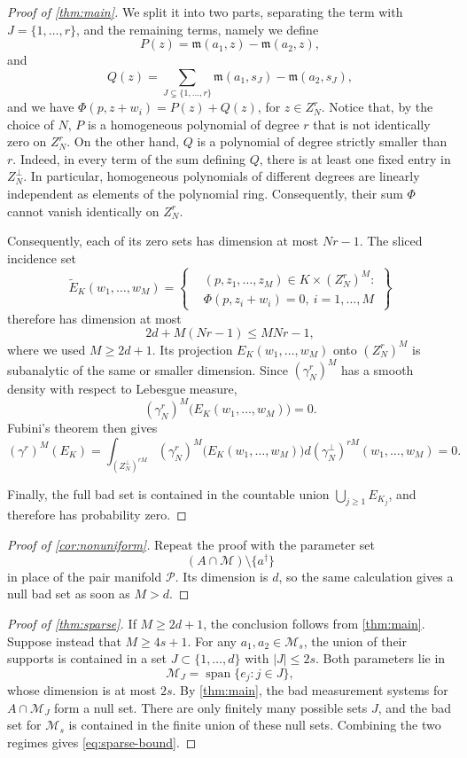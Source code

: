\documentclass[11pt,oneside]{amsart}
\theoremstyle{plain}
\theoremstyle{definition}
\theoremstyle{remark}
\newcommand{\calM}{\mathcal{M}}
\begin{document}
\begin{proof}[Proof of \cref{thm:main}]
We split it into two parts, separating the term with $J=\{1,\dots,r\}$, and the remaining terms, namely we define
\[
    P(z)=\mathfrak{m}(a_1,z)-\mathfrak{m}(a_2,z),
\]
and
\[
    Q(z)= \sum_{J\subsetneq\{1,\dots,r\}}\mathfrak m(a_1,s_J)-\mathfrak m(a_2,s_J),
\]
and we have $\Phi(p,z+w_i)=P(z)+Q(z)$, for $z\in Z_{N}^r$.
Notice that, by the choice of $N$, $P$ is a homogeneous polynomial of degree $r$ that is not identically zero on $Z_{N}^r$. On the other hand, $Q$ is a polynomial of degree strictly smaller than $r$. Indeed, in every term of the sum defining $Q$, there is at least one fixed entry in $Z_{N}^\perp$. In particular, homogeneous polynomials of different degrees are linearly independent as elements of the polynomial ring. Consequently, their sum $\Phi$ cannot vanish identically on $Z_{N}^r$.

Consequently, each of its zero sets has dimension at most $Nr-1$. The sliced incidence set
\[
    \widetilde E_K(w_1,\ldots,w_M)
    =\left\{
      \begin{aligned}
        &(p,z_1,\ldots,z_M)\in K\times(Z_N^r)^M:\\[-2pt]
        &\Phi(p,z_i+w_i)=0,~i=1,\dots,M
      \end{aligned}
    \right\}
\]
therefore has dimension at most
\[
    2d+M(Nr-1)\leq MNr-1,
\]
where we used $M\ge2d+1$.
Its projection $E_K(w_1,\ldots,w_M)$ onto $(Z_N^r)^M$ is subanalytic of the same or smaller dimension. Since $(\gamma_N^r)^M$ has a smooth density with respect to Lebesgue measure,
\[
    (\gamma_N^r)^M\bigl(E_K(w_1,\ldots,w_M)\bigr)=0.
\]
Fubini's theorem then gives 
\[
   (\gamma^r)^M(E_K)=\int_{(Z_N^\perp)^{rM}} (\gamma_N^r)^M\bigl(E_K(w_1,\ldots,w_M)\bigr) d(\gamma_N^\perp)^{rM}(w_1,\dots,w_M)=0.
\]

Finally, the full bad set is contained in the countable union $\bigcup_{j\geq1}E_{K_j}$, and therefore has probability zero.
\end{proof}

\begin{proof}[Proof of \cref{cor:nonuniform}]
Repeat the proof with the parameter set
\[
    (A\cap\calM)\setminus\{a^\dagger\}
\]
in place of the pair manifold $\mathcal P$. Its dimension is $d$, so the same calculation gives a null bad set as soon as $M>d$.
\end{proof}

\begin{proof}[Proof of \cref{thm:sparse}]
If $M\geq2d+1$, the conclusion follows from \cref{thm:main}. Suppose instead that $M\geq4s+1$. For any $a_1,a_2\in\calM_s$, the union of their supports is contained in a set $J\subset\{1,\ldots,d\}$ with $|J|\leq2s$. Both parameters lie in
\[
    \calM_J=\operatorname{span}\{e_j:j\in J\},
\]
whose dimension is at most $2s$. By \cref{thm:main}, the bad measurement systems for $A\cap\calM_J$ form a null set. There are only finitely many possible sets $J$, and the bad set for $\calM_s$ is contained in the finite union of these null sets. Combining the two regimes gives \eqref{eq:sparse-bound}.
\end{proof}
\end{document}
